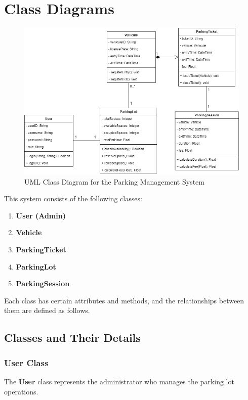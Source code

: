 \section{Class Diagrams}

\begin{figure}[h!]
    \centering
    \includegraphics[width=1\textwidth]{Class_Diagram_Parkinglot_System.jpg} %
    \caption{UML Class Diagram for the Parking Management System}
    \label{fig:uml}
\end{figure}

This system consists of the following classes:

\begin{enumerate}
    \item \textbf{User (Admin)}
    \item \textbf{Vehicle}
    \item \textbf{ParkingTicket}
    \item \textbf{ParkingLot}
    \item \textbf{ParkingSession}
\end{enumerate}

Each class has certain attributes and methods, and the relationships between them are defined as follows.

\subsection{Classes and Their Details}

\subsubsection{User Class}
The \textbf{User} class represents the administrator who manages the parking lot operations.

